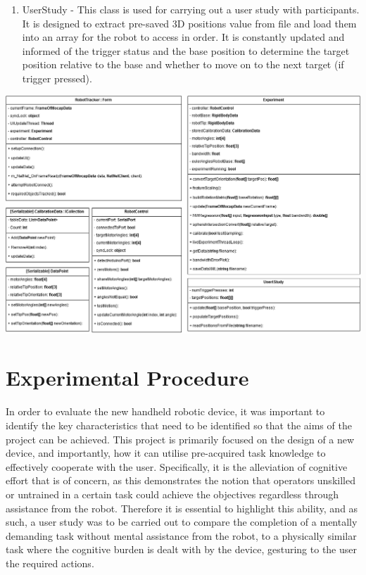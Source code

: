 \documentclass[11pt]{article}
\begin{document}
\begin{enumerate}
\item{UserStudy - This class is used for carrying out a user study with participants. It is designed to extract pre-saved 3D positions value from file and load them into an array for the robot to access in order. It is constantly updated and informed of the trigger status and the base position to determine the target position relative to the base and whether to move on to the next target (if trigger pressed).}
\end{enumerate}


\begin{landscape}

\begin{center}
\includegraphics[width=1.4\textwidth]{images/classDiagram2.png}
\label{figure:classDiagram}
\end{center}


\end{landscape}



\section{Experimental Procedure}

In order to evaluate the new handheld robotic device, it was important to identify the key characteristics that need to be identified so that the aims of the project can be achieved. This project is primarily focused on the design of a new device, and importantly, how it can utilise pre-acquired task knowledge to effectively cooperate with the user. Specifically, it is the alleviation of cognitive effort that is of concern, as this demonstrates the notion that operators unskilled or untrained in a certain task could achieve the objectives regardless through assistance from the robot. Therefore it is essential to highlight this ability, and as such, a user study was to be carried out to compare the completion of a mentally demanding task without mental assistance from the robot, to a physically similar task where the cognitive burden is dealt with by the device, gesturing to the user the required actions.
\end{document}
